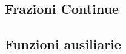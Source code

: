 \documentclass{article}
\begin{document}
	\subsection{Frazioni Continue}
	\vspace{1cm}
	
	\vspace{1cm}\vspace{1cm}
	\subsection{Funzioni ausiliarie}
	\vspace{1cm}
	
	\vspace{1cm}
	
	\vspace{1cm}
\end{document}
